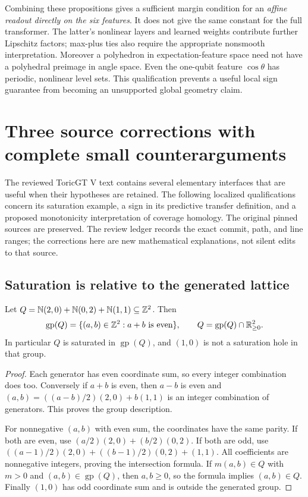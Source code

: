 Combining these propositions gives a sufficient margin condition for an
\emph{affine readout directly on the six features}. It does not give the
same constant for the full transformer. The latter's nonlinear layers
and learned weights contribute further Lipschitz factors; max-plus ties
also require the appropriate nonsmooth interpretation. Moreover a
polyhedron in expectation-feature space need not have a polyhedral
preimage in angle space. Even the one-qubit feature $\cos\theta$ has
periodic, nonlinear level sets. This qualification prevents a useful
local sign guarantee from becoming an unsupported global geometry claim.

\section{Three source corrections with complete small counterarguments}

The reviewed ToricGT V text contains several elementary interfaces that
are useful when their hypotheses are retained. The following localized
qualifications concern its saturation example, a sign in its predictive
transfer definition, and a proposed monotonicity interpretation of
coverage homology. The original pinned sources are preserved. The review
ledger records the exact commit, path, and line ranges; the corrections
here are new mathematical explanations, not silent edits to that source.
\cite{qtToricGTAlgebra}

\subsection{Saturation is relative to the generated lattice}

\begin{proposition}
\label{qt:parity-normal}
Let
$Q=\mathbb{N}(2,0)+\mathbb{N}(0,2)+\mathbb{N}(1,1)\subseteq\mathbb{Z}^2$. Then
\[
 \operatorname{gp}(Q)=\{(a,b)\in\mathbb{Z}^2:a+b\text{ is even}\},
 \qquad
 Q=\operatorname{gp}(Q)\cap\mathbb{R}_{\geq0}^2.
\]
In particular $Q$ is saturated in $\operatorname{gp}(Q)$, and $(1,0)$ is
not a saturation hole in that group.
\end{proposition}
\begin{proof}
Each generator has even coordinate sum, so every integer combination
does too. Conversely if $a+b$ is even, then $a-b$ is even and
$(a,b)=((a-b)/2)(2,0)+b(1,1)$ is an integer combination of generators.
This proves the group description.

For nonnegative $(a,b)$ with even sum, the coordinates have the same
parity. If both are even, use $(a/2)(2,0)+(b/2)(0,2)$. If both are odd,
use $((a-1)/2)(2,0)+((b-1)/2)(0,2)+(1,1)$. All coefficients are
nonnegative integers, proving the intersection formula. If
$m(a,b)\in Q$ with $m>0$ and $(a,b)\in\operatorname{gp}(Q)$, then
$a,b\geq0$, so the formula implies $(a,b)\in Q$.
Finally $(1,0)$ has odd coordinate sum and is outside the generated group.
\end{proof}

